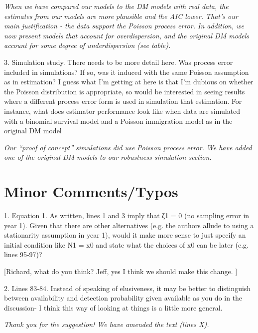 \documentclass[12pt,english]{article}
\begin{document}
\begin{spacing}{1.9}
\begin{flushleft}
\vspace{0.5cm}
\textit{When we have compared our models to the DM models with real data, the estimates from our models
are more plausible and the AIC lower.  That's our main justification - the data support the Poisson process error.
In addition, we now present models that account for overdispersion, and the original DM models account for
some degree of underdispersion (see table).}
\vspace{0.5cm}

3. Simulation study. There needs to be more detail here. Was process error included in simulations? If so, was it 
induced with the same Poisson assumption as in estimation? I guess what I'm getting at here is that I'm dubious 
on whether the Poisson distribution is appropriate, so would be interested in seeing results where a different process 
error form is used in simulation that estimation. For instance, what does estimator performance look like when data 
are simulated with a binomial survival model and a Poisson immigration model as in the original DM model

\vspace{0.5cm}
\textit{Our ``proof of concept'' simulations did use Poisson process error.  We have added one of the original DM
models to our robustness simulation section.}
\vspace{0.5cm}

\section*{Minor Comments/Typos}
1. Equation 1. As written, lines 1 and 3 imply that ζ1 = 0 (no sampling error in year 1). Given that there are 
other alternatives (e.g. the authors allude to using a stationarity assumption in year 1), would it make more 
sense to just specify an initial condition like N1 = x0 and state what the choices of x0 can be later (e.g. lines 95-97)?

\vspace{0.5cm}
[Richard, what do you think?   Jeff, yes I think we should make this change. ]
\vspace{0.5cm}

2. Lines 83-84. Instead of speaking of elusiveness, it may be better to distinguish between availability 
and detection probability given available as you do in the discussion- I think this way of looking at things is a little more general.

\vspace{0.5cm}
\textit{Thank you for the suggestion!  We have amended the text (lines X).}
\vspace{0.5cm}


\end{flushleft}
\end{spacing}
\end{document}
